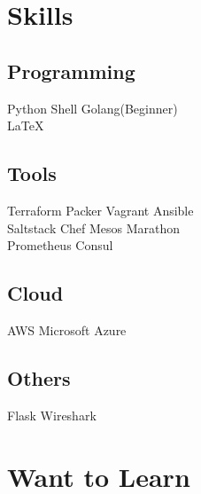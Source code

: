 \documentclass[]{deedy-resume-openfont}
\begin{document}
%
%

%
%



%
%

\begin{minipage}[t]{0.33\textwidth}


\section{Skills}
\subsection{Programming}
Python \textbullet{}   Shell \textbullet{} Golang(Beginner) \\
\textbullet{} \LaTeX\ \\
\subsection{Tools}
Terraform \textbullet{} Packer \textbullet{} Vagrant \textbullet{} Ansible \\
\textbullet{} Saltstack  \textbullet{} Chef \textbullet{} Mesos Marathon\\
\textbullet{} Prometheus \textbullet{} Consul\\
\subsection{Cloud}
AWS \textbullet{} Microsoft Azure\\
\subsection{Others}
Flask \textbullet{} Wireshark
\sectionsep

\section{Want to Learn}

\end{minipage}
\end{document}
